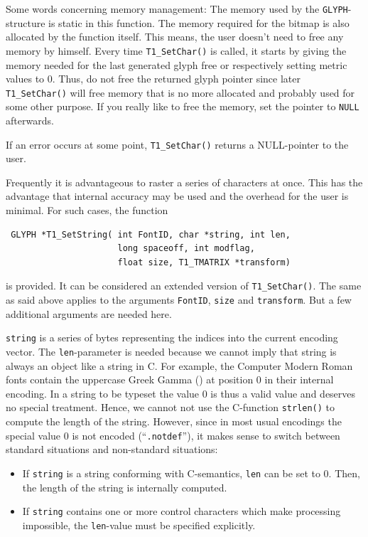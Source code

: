 Some words concerning memory management: The memory used by
the \verb+GLYPH+-structure is static in this function. The memory
required for the bitmap is also allocated by the function itself.
This means, the user doesn't need to free any memory by
himself. Every time \verb+T1_SetChar()+ is called, it starts by giving the
memory needed for the last generated glyph free or respectively
setting metric values to 0. Thus, do not free the
returned glyph pointer since later \verb+T1_SetChar()+ will free
memory that is no more allocated and probably used for some other purpose.
If you really like to free the memory, set the pointer to \verb+NULL+
afterwards. 

If an error occurs at some point, \verb+T1_SetChar()+ returns a
NULL-pointer to the user.

Frequently it is advantageous to raster a series of
characters at once. This has the advantage that internal accuracy may
be used and the overhead for the user is minimal. For such cases, the
function 
\precorr
\begin{verbatim}
 GLYPH *T1_SetString( int FontID, char *string, int len, 
                      long spaceoff, int modflag, 
                      float size, T1_TMATRIX *transform)
\end{verbatim}\postcorr
is provided.
It can be considered an extended version of \verb+T1_SetChar()+. The
same as said above applies to the arguments \verb+FontID+,
\verb+size+ and \verb+transform+. But a few additional arguments are
needed here. 

\verb+string+ is a series of bytes representing the indices into the current
encoding vector. 
The \verb+len+-parameter is needed because we cannot imply that string
is always an object like a string in C. For example, the Computer
Modern Roman fonts contain the uppercase Greek Gamma () at
position 0 in their internal encoding. In a string to be typeset the
value 0 is thus a valid value and deserves no special
treatment. Hence, we cannot not use the C-function \verb+strlen()+ to
compute the length of the string. However, since in most usual encodings
the special value 0 is not encoded (``\verb+.notdef+''), it makes
sense to switch between 
standard situations and non-standard situations:
\begin{itemize}
\item If \verb+string+ is a string conforming with C-semantics,
  \verb+len+ can be set to 0. Then, the length of the string is
  internally computed.
\item If \verb+string+ contains one or more control characters which make
  processing impossible, the \verb+len+-value must be specified
  explicitly. 
\end{itemize}

